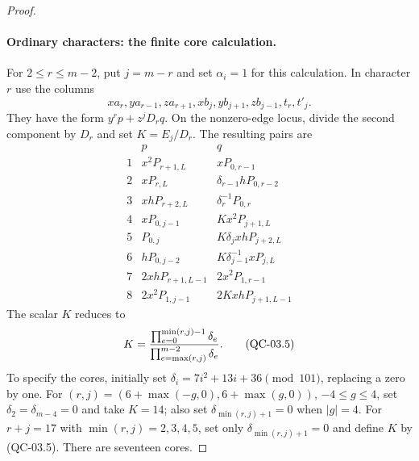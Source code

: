 \begin{proof}
\paragraph{Ordinary characters: the finite core calculation.}
For $2\leq r\leq m-2$, put $j=m-r$ and set $\alpha_i=1$ for
this calculation. In character $r$ use the columns
\[
 xa_r,ya_{r-1},za_{r+1},xb_j,yb_{j+1},zb_{j-1},t_r,t'_j.
\]
They have the form $y^rp+z^jD_rq$. On the nonzero-edge locus,
divide the second component by $D_r$ and set $K=E_j/D_r$.
The resulting pairs are
\[
\begin{array}{c|c|c}
 &p&q\\\hline
1&x^2P_{r+1,L}&xP_{0,r-1}\\
2&xP_{r,L}&\delta_{r-1}hP_{0,r-2}\\
3&xhP_{r+2,L}&\delta_r^{-1}P_{0,r}\\
4&xP_{0,j-1}&Kx^2P_{j+1,L}\\
5&P_{0,j}&K\delta_jxhP_{j+2,L}\\
6&hP_{0,j-2}&K\delta_{j-1}^{-1}xP_{j,L}\\
7&2xhP_{r+1,L-1}&2x^2P_{1,r-1}\\
8&2x^2P_{1,j-1}&2KxhP_{j+1,L-1}
\end{array}\tag{QC-03.4}
\]
The scalar $K$ reduces to
\[
 K={\prod_{e=0}^{\min(r,j)-1}\delta_e\over
             \prod_{e=\max(r,j)}^{m-2}\delta_e}.
 \tag{QC-03.5}
\]
To specify the cores, initially set
$\delta_i=7i^2+13i+36\pmod{101}$, replacing a zero by one.
For $(r,j)=(6+\max(-g,0),6+\max(g,0))$, $-4\leq g\leq4$,
set $\delta_2=\delta_{m-4}=0$ and take $K=14$; also set
$\delta_{\min(r,j)+1}=0$ when $|g|=4$.
For $r+j=17$ with $\min(r,j)=2,3,4,5$, set only
$\delta_{\min(r,j)+1}=0$ and define $K$ by (QC-03.5).
There are seventeen cores.


\end{proof}
